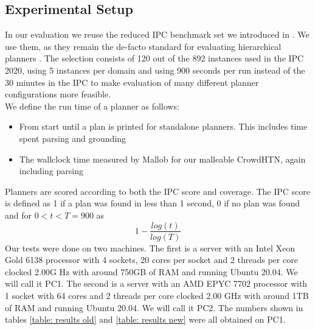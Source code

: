 \subsection{Experimental Setup}
\label{eval: setup}
In our evaluation we reuse the reduced IPC benchmark set we introduced in \cite{bretl2021parallel}.
We use them, as they remain the de-facto standard for evaluating hierarchical planners \cite{schreiber2021lilotane, holler2020htn, holler2021landmark, bretl2021parallel}.
The selection consists of 120 out of the 892 instances used in the IPC 2020, using 5 instances per domain and using 900 seconds per run instead of the 30 minutes in the IPC to make evaluation of many different planner configurations more feasible. \\
We define the run time of a planner as follows:
\begin{itemize}
	\item From start until a plan is printed for standalone planners. This includes time spent parsing and grounding
	\item The wallclock time measured by Mallob for our malleable CrowdHTN, again including parsing
\end{itemize}
Planners are scored according to both the IPC score and coverage. The IPC score is defined as 1 if a plan was found in less than 1 second, 0 if no plan was found and for $0 < t < T = 900$ as
\[
1 - \frac{log(t)}{log(T)}
\]
Our tests were done on two machines. The first is a server with an Intel Xeon Gold 6138 processor with 4 sockets, 20 cores per socket and 2 threads per core clocked 2.00G Hz with around 750GB of RAM and running Ubuntu 20.04. We will call it PC1. The second is a server with an AMD EPYC 7702 processor with 1 socket with 64 cores and 2 threads per core clocked 2.00 GHz with around 1TB of RAM and running Ubuntu 20.04. We will call it PC2. The numbers shown in tables \ref{table: results old} and \ref{table: results new} were all obtained on PC1.\\


